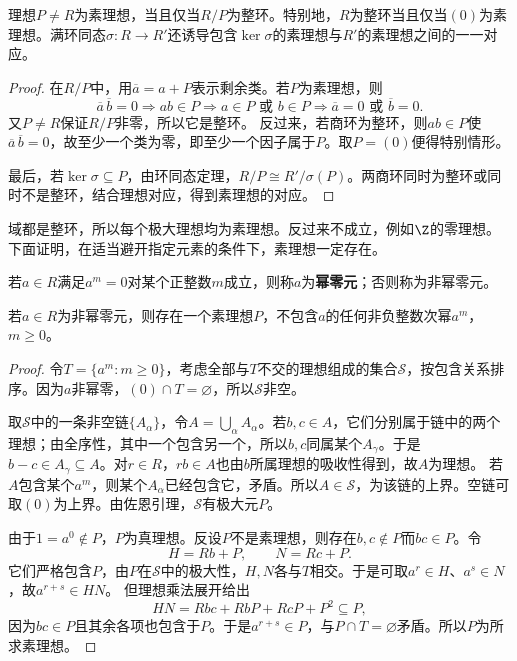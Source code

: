 \begin{theorem}\label{p2:prime-domain}
理想$P\ne R$为素理想，当且仅当$R/P$为整环。特别地，$R$为整环当且仅当$(0)$为素理想。满环同态$\sigma:R\to R'$还诱导包含$\ker\sigma$的素理想与$R'$的素理想之间的一一对应。
\end{theorem}
\begin{proof}
在$R/P$中，用$\overline a=a+P$表示剩余类。若$P$为素理想，则
\[
\overline a\,\overline b=0
\Longrightarrow ab\in P
\Longrightarrow a\in P\text{ 或 }b\in P
\Longrightarrow\overline a=0\text{ 或 }\overline b=0.
\]
又$P\ne R$保证$R/P$非零，所以它是整环。
反过来，若商环为整环，则$ab\in P$使$\overline a\,\overline b=0$，故至少一个类为零，即至少一个因子属于$P$。取$P=(0)$便得特别情形。

最后，若$\ker\sigma\subseteq P$，由环同态定理，$R/P\cong R'/\sigma(P)$。两商环同时为整环或同时不是整环，结合理想对应，得到素理想的对应。
\end{proof}

域都是整环，所以每个极大理想均为素理想。反过来不成立，例如$\Z$的零理想。下面证明，在适当避开指定元素的条件下，素理想一定存在。

\begin{definition}
若$a\in R$满足$a^m=0$对某个正整数$m$成立，则称$a$为\textbf{幂零元}；否则称为非幂零元。
\end{definition}

\begin{theorem}\label{p2:prime-avoid-powers}
若$a\in R$为非幂零元，则存在一个素理想$P$，不包含$a$的任何非负整数次幂$a^m$，$m\geq0$。
\end{theorem}
\begin{proof}
令$T=\{a^m:m\geq0\}$，考虑全部与$T$不交的理想组成的集合$\mathcal S$，按包含关系排序。因为$a$非幂零，$(0)\cap T=\varnothing$，所以$\mathcal S$非空。

取$\mathcal S$中的一条非空链$\{A_\alpha\}$，令$A=\bigcup_\alpha A_\alpha$。若$b,c\in A$，它们分别属于链中的两个理想；由全序性，其中一个包含另一个，所以$b,c$同属某个$A_\gamma$。于是$b-c\in A_\gamma\subseteq A$。对$r\in R$，$rb\in A$也由$b$所属理想的吸收性得到，故$A$为理想。
若$A$包含某个$a^m$，则某个$A_\alpha$已经包含它，矛盾。所以$A\in\mathcal S$，为该链的上界。空链可取$(0)$为上界。由佐恩引理，$\mathcal S$有极大元$P$。

由于$1=a^0\notin P$，$P$为真理想。反设$P$不是素理想，则存在$b,c\notin P$而$bc\in P$。令
\[
H=Rb+P,\qquad N=Rc+P.
\]
它们严格包含$P$，由$P$在$\mathcal S$中的极大性，$H,N$各与$T$相交。于是可取$a^r\in H$、$a^s\in N$，故$a^{r+s}\in HN$。
但理想乘法展开给出
\[
HN=Rbc+RbP+RcP+P^2\subseteq P,
\]
因为$bc\in P$且其余各项也包含于$P$。于是$a^{r+s}\in P$，与$P\cap T=\varnothing$矛盾。所以$P$为所求素理想。
\end{proof}

